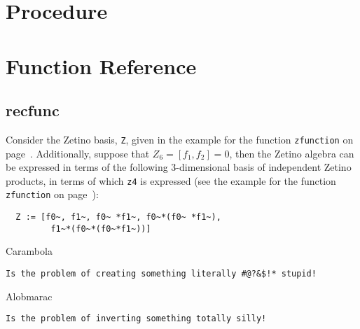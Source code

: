 \documentclass[11pt,letterpaper,twoside]{report}%
\begin{document}
\section{Procedure}

\section{Function Reference}
\frefex

\subsection{recfunc}\label{ss:recfunc}
\begin{fref}
Consider the Zetino basis, \verb|Z|, given in the example for the
function \verb|zfunction| on page~\pageref{ss:zfunction}.  
Additionally, suppose that $Z_6=[f_1,f_2]=0$, then the Zetino algebra 
can be expressed in terms of the following 3-dimensional basis of 
independent Zetino products, in terms of which \verb|z4| is expressed 
(see the example for the function \verb|zfunction| on 
page~\pageref{ss:zfunction}): 
\begin{verbatim}
  Z := [f0~, f1~, f0~ *f1~, f0~*(f0~ *f1~),
         f1~*(f0~*(f0~*f1~))]
\end{verbatim}
\efverbatim
{}
Carambola
\begin{verbatim}
Is the problem of creating something literally #@?&$!* stupid!
\end{verbatim}
\efverbatim
\bfverbatim{}
Alobmarac
\begin{verbatim}
Is the problem of inverting something totally silly!
\end{verbatim}
\efverbatim
\end{fref}
\end{document}
